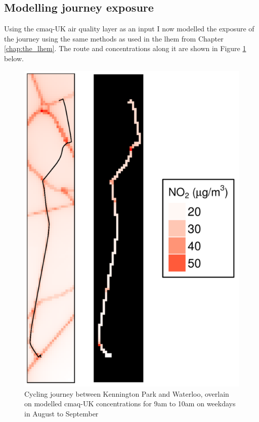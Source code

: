 \subsection{Modelling journey exposure}
\label{subsec:modellingjourneyexposure}

Using the \gls{cmaq}-UK air quality layer as an input I now modelled the exposure of the journey using the same methods as used in the \gls{lhem} from Chapter \ref{chap:the_lhem}. The route and concentrations along it are shown in Figure \ref{fig:dual_exposure_cycling} below.

\begin{figure}[H]
\centering
\includegraphics[scale=1]{images/dual_exposure_cycling.png}
\caption{Cycling journey between Kennington Park and Waterloo, overlain on modelled \gls{cmaq}-UK concentrations for 9am to 10am on weekdays in August to September}
\label{fig:dual_exposure_cycling}
\end{figure}

